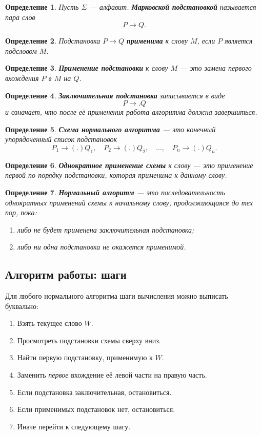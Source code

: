\documentclass[12pt,a4paper]{article}
\newtheorem{definition}{Определение}
\begin{document}
\begin{definition}
Пусть $\Sigma$ --- алфавит. \textbf{Марковской подстановкой} называется пара слов
\[
P \to Q.
\]
\end{definition}

\begin{definition}
Подстановка $P\to Q$ \textbf{применима} к слову $M$, если $P$ является подсловом $M$.
\end{definition}

\begin{definition}
\textbf{Применение подстановки} к слову $M$ --- это замена \emph{первого} вхождения $P$ в $M$ на $Q$.
\end{definition}

\begin{definition}
\textbf{Заключительная подстановка} записывается в виде
\[
P\to. Q
\]
и означает, что после её применения работа алгоритма должна завершиться.
\end{definition}

\begin{definition}
\textbf{Схема нормального алгоритма} --- это конечный упорядоченный список подстановок
\[
P_1\to(.)Q_1,\quad P_2\to(.)Q_2,\quad \dots,\quad P_n\to(.)Q_n.
\]
\end{definition}

\begin{definition}
\textbf{Однократное применение схемы} к слову --- это применение первой по порядку подстановки, которая применима к данному слову.
\end{definition}

\begin{definition}
\textbf{Нормальный алгоритм} --- это последовательность однократных применений схемы к начальному слову, продолжающаяся до тех пор, пока:
\begin{enumerate}
    \item либо не будет применена заключительная подстановка;
    \item либо ни одна подстановка не окажется применимой.
\end{enumerate}
\end{definition}

\subsection{Алгоритм работы: шаги}
Для любого нормального алгоритма шаги вычисления можно выписать буквально:

\begin{enumerate}
    \item Взять текущее слово $W$.
    \item Просмотреть подстановки схемы сверху вниз.
    \item Найти первую подстановку, применимую к $W$.
    \item Заменить \emph{первое} вхождение её левой части на правую часть.
    \item Если подстановка заключительная, остановиться.
    \item Если применимых подстановок нет, остановиться.
    \item Иначе перейти к следующему шагу.
\end{enumerate}
\end{document}
